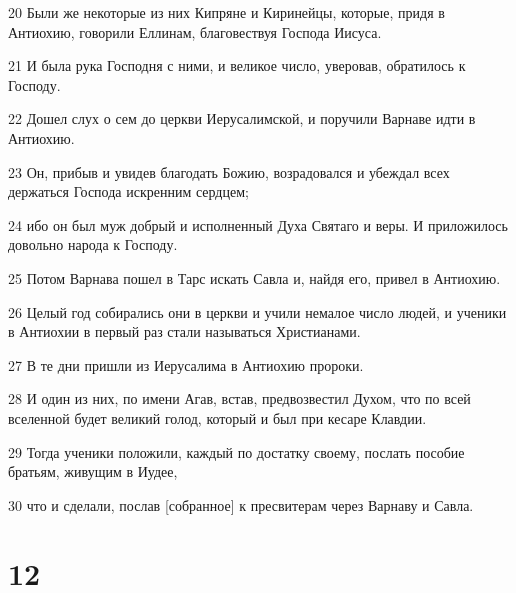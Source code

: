 \par 20 Были же некоторые из них Кипряне и Киринейцы, которые, придя в Антиохию, говорили Еллинам, благовествуя Господа Иисуса.
\par 21 И была рука Господня с ними, и великое число, уверовав, обратилось к Господу.
\par 22 Дошел слух о сем до церкви Иерусалимской, и поручили Варнаве идти в Антиохию.
\par 23 Он, прибыв и увидев благодать Божию, возрадовался и убеждал всех держаться Господа искренним сердцем;
\par 24 ибо он был муж добрый и исполненный Духа Святаго и веры. И приложилось довольно народа к Господу.
\par 25 Потом Варнава пошел в Тарс искать Савла и, найдя его, привел в Антиохию.
\par 26 Целый год собирались они в церкви и учили немалое число людей, и ученики в Антиохии в первый раз стали называться Христианами.
\par 27 В те дни пришли из Иерусалима в Антиохию пророки.
\par 28 И один из них, по имени Агав, встав, предвозвестил Духом, что по всей вселенной будет великий голод, который и был при кесаре Клавдии.
\par 29 Тогда ученики положили, каждый по достатку своему, послать пособие братьям, живущим в Иудее,
\par 30 что и сделали, послав [собранное] к пресвитерам через Варнаву и Савла.

\chapter{12}

